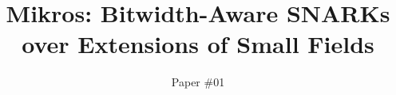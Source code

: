 \documentclass[runningheads]{llncs}
\begin{document}
\title{Mikros: Bitwidth-Aware SNARKs over Extensions of Small Fields}


\author{Paper \#01 \institute{\,} }

%
\maketitle
\end{document}

